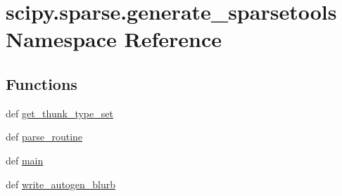 \hypertarget{namespacescipy_1_1sparse_1_1generate__sparsetools}{}\section{scipy.\+sparse.\+generate\+\_\+sparsetools Namespace Reference}
\label{namespacescipy_1_1sparse_1_1generate__sparsetools}
\subsection*{Functions}
\begin{DoxyCompactItemize}
\item 
def \hyperlink{namespacescipy_1_1sparse_1_1generate__sparsetools_a277cdc39ec98ccfaba1506461b60deae}{get\+\_\+thunk\+\_\+type\+\_\+set}
\item 
def \hyperlink{namespacescipy_1_1sparse_1_1generate__sparsetools_a11f9b4d9d306faaa0079ddfc1bc6bf19}{parse\+\_\+routine}
\item 
def \hyperlink{namespacescipy_1_1sparse_1_1generate__sparsetools_a62e4a51d4dd670fab855f851f07e6253}{main}
\item 
def \hyperlink{namespacescipy_1_1sparse_1_1generate__sparsetools_a2eaea6f40472e02dedc6db3d1f59b1b3}{write\+\_\+autogen\+\_\+blurb}
\end{DoxyCompactItemize}
